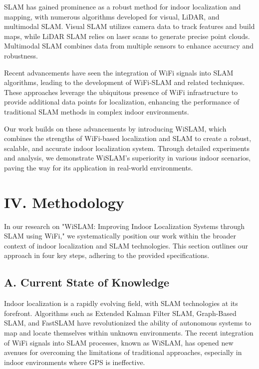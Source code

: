 \documentclass[
	a4paper, %
	11pt, %
	unnumberedsections, %
	twoside, %
]{LTJournalArticle}
\begin{document}
SLAM has gained prominence as a robust method for indoor localization and mapping, with numerous algorithms developed for visual, LiDAR, and multimodal SLAM. Visual SLAM utilizes camera data to track features and build maps, while LiDAR SLAM relies on laser scans to generate precise point clouds. Multimodal SLAM combines data from multiple sensors to enhance accuracy and robustness.

Recent advancements have seen the integration of WiFi signals into SLAM algorithms, leading to the development of WiFi-SLAM and related techniques. These approaches leverage the ubiquitous presence of WiFi infrastructure to provide additional data points for localization, enhancing the performance of traditional SLAM methods in complex indoor environments.

Our work builds on these advancements by introducing WiSLAM, which combines the strengths of WiFi-based localization and SLAM to create a robust, scalable, and accurate indoor localization system. Through detailed experiments and analysis, we demonstrate WiSLAM's superiority in various indoor scenarios, paving the way for its application in real-world environments.


\section{IV. Methodology}

In our research on "WiSLAM: Improving Indoor Localization Systems through SLAM using WiFi," we systematically position our work within the broader context of indoor localization and SLAM technologies. This section outlines our approach in four key steps, adhering to the provided specifications.

\subsection{A.	Current State of Knowledge}
Indoor localization is a rapidly evolving field, with SLAM technologies at its forefront. Algorithms such as Extended Kalman Filter SLAM, Graph-Based SLAM, and FastSLAM have revolutionized the ability of autonomous systems to map and locate themselves within unknown environments. The recent integration of WiFi signals into SLAM processes, known as WiSLAM, has opened new avenues for overcoming the limitations of traditional approaches, especially in indoor environments where GPS is ineffective.
\end{document}
